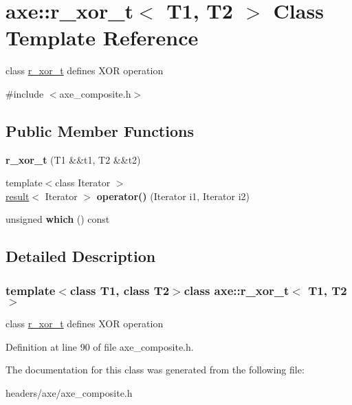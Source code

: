 \hypertarget{classaxe_1_1r__xor__t}{\section{axe\+:\+:r\+\_\+xor\+\_\+t$<$ T1, T2 $>$ Class Template Reference}
\label{classaxe_1_1r__xor__t}
}


class \hyperlink{classaxe_1_1r__xor__t}{r\+\_\+xor\+\_\+t} defines X\+O\+R operation  




{\ttfamily \#include $<$axe\+\_\+composite.\+h$>$}

\subsection*{Public Member Functions}
\begin{DoxyCompactItemize}
\item 
\hypertarget{classaxe_1_1r__xor__t_afe4e6665d3e6a5e54735c0687a7f82df}{{\bfseries r\+\_\+xor\+\_\+t} (T1 \&\&t1, T2 \&\&t2)}\label{classaxe_1_1r__xor__t_afe4e6665d3e6a5e54735c0687a7f82df}

\item 
\hypertarget{classaxe_1_1r__xor__t_a9730a3df6bf19e10036119c49b1dcdeb}{{\footnotesize template$<$class Iterator $>$ }\\\hyperlink{structaxe_1_1result}{result}$<$ Iterator $>$ {\bfseries operator()} (Iterator i1, Iterator i2)}\label{classaxe_1_1r__xor__t_a9730a3df6bf19e10036119c49b1dcdeb}

\item 
\hypertarget{classaxe_1_1r__xor__t_a9a6dcb4f9b46b1665047a6a58a6d67e2}{unsigned {\bfseries which} () const }\label{classaxe_1_1r__xor__t_a9a6dcb4f9b46b1665047a6a58a6d67e2}

\end{DoxyCompactItemize}


\subsection{Detailed Description}
\subsubsection*{template$<$class T1, class T2$>$class axe\+::r\+\_\+xor\+\_\+t$<$ T1, T2 $>$}

class \hyperlink{classaxe_1_1r__xor__t}{r\+\_\+xor\+\_\+t} defines X\+O\+R operation 

Definition at line 90 of file axe\+\_\+composite.\+h.



The documentation for this class was generated from the following file\+:\begin{DoxyCompactItemize}
\item 
headers/axe/axe\+\_\+composite.\+h\end{DoxyCompactItemize}
